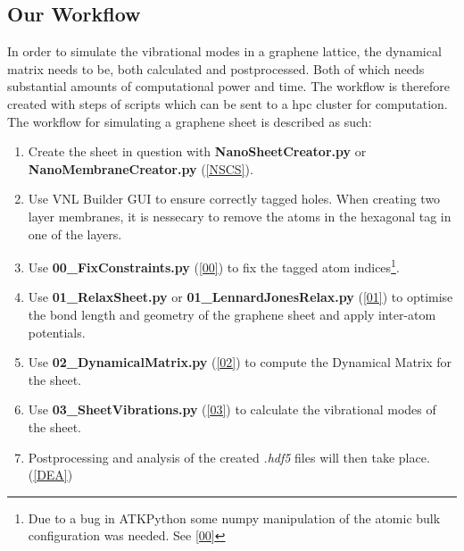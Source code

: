 
\subsection{Our Workflow}
In order to simulate the vibrational modes in a graphene lattice, the dynamical matrix needs to be, both calculated and postprocessed. Both of which needs substantial amounts of computational power and time. The workflow is therefore created with steps of scripts which can be sent to a hpc cluster for computation.
The workflow for simulating a graphene sheet is described as such:
\begin{enumerate}
  \item Create the sheet in question with \textbf{NanoSheetCreator.py} or \textbf{NanoMembraneCreator.py} (\cref{NSCS}).
  \item Use VNL Builder GUI to ensure correctly tagged holes. When creating two layer membranes, it is nessecary to remove the atoms in the hexagonal tag in one of the layers.
  \item Use \textbf{00\_FixConstraints.py} (\cref{00}) to fix the tagged atom indices\footnote{Due to a bug in ATKPython some numpy manipulation of the atomic bulk configuration was needed. See \cref{00}}.
  \item Use \textbf{01\_RelaxSheet.py} or \textbf{01\_LennardJonesRelax.py} (\cref{01}) to optimise the bond length and geometry of the graphene sheet and apply inter-atom potentials.
  \item Use \textbf{02\_DynamicalMatrix.py} (\cref{02}) to compute the Dynamical Matrix for the sheet.
  \item Use \textbf{03\_SheetVibrations.py} (\cref{03}) to calculate the vibrational modes of the sheet.
  \item Postprocessing and analysis of the created \textit{.hdf5} files will then take place. (\cref{DEA})
\end{enumerate}
